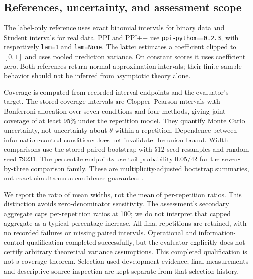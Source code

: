 \documentclass{article}
\begin{document}
\subsection{References, uncertainty, and assessment scope}
The label-only reference uses exact binomial intervals for binary data and Student intervals for real data. PPI and PPI++ use \texttt{ppi-python==0.2.3}, with respectively \texttt{lam=1} and \texttt{lam=None}. The latter estimates a coefficient clipped to $[0,1]$ and uses pooled prediction variance. On constant scores it uses coefficient zero. Both references return normal-approximation intervals; their finite-sample behavior should not be inferred from asymptotic theory alone.

Coverage is computed from recorded interval endpoints and the evaluator's target. The stored coverage intervals are Clopper--Pearson intervals with Bonferroni allocation over seven conditions and four methods, giving joint coverage of at least $95\%$ under the repetition model. They quantify Monte Carlo uncertainty, not uncertainty about $\theta$ within a repetition. Dependence between information-control conditions does not invalidate the union bound. Width comparisons use the stored paired bootstrap with 512 seed resamples and random seed 79231. The percentile endpoints use tail probability $0.05/42$ for the seven-by-three comparison family. These are multiplicity-adjusted bootstrap summaries, not exact simultaneous confidence guarantees \citep{Efron,EfronTibshirani,Dunn}.

We report the ratio of mean widths, not the mean of per-repetition ratios. This distinction avoids zero-denominator sensitivity. The assessment's secondary aggregate caps per-repetition ratios at 100; we do not interpret that capped aggregate as a typical percentage increase. All final repetitions are retained, with no recorded failures or missing paired intervals. Operational and information-control qualification completed successfully, but the evaluator explicitly does not certify arbitrary theoretical variance assumptions. This completed qualification is not a coverage theorem. Selection used development evidence; final measurements and descriptive source inspection are kept separate from that selection history.
\end{document}
